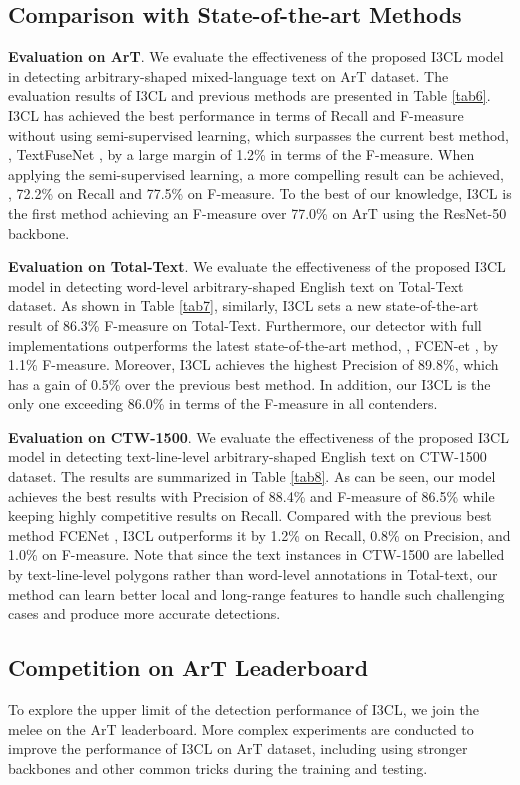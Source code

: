 \subsection{Comparison with State-of-the-art Methods}

\noindent\textbf{Evaluation on ArT}. We evaluate the effectiveness of the proposed I3CL model in detecting arbitrary-shaped mixed-language text on ArT dataset. The evaluation results of I3CL and previous methods are presented in Table \ref{tab6}. I3CL has achieved the best performance in terms of Recall and F-measure without using semi-supervised learning, which surpasses the current best method, , TextFuseNet \citep{textfusenet}, by a large margin of 1.2\% in terms of the F-measure. When applying the semi-supervised learning, a more compelling result can be achieved, , 72.2\% on Recall and 77.5\% on F-measure. To the best of our knowledge, I3CL is the first method achieving an F-measure over 77.0\% on ArT using the ResNet-50 backbone.

\noindent\textbf{Evaluation on Total-Text}. We evaluate the effectiveness of the proposed I3CL model in detecting word-level arbitrary-shaped English text on Total-Text dataset. As shown in Table \ref{tab7}, similarly, I3CL sets a new state-of-the-art result of 86.3\% F-measure on Total-Text. Furthermore, our detector with full implementations outperforms the latest state-of-the-art method, , FCEN-et \citep{fcenet}, by 1.1\% F-measure. Moreover, I3CL achieves the highest Precision of 89.8\%, which has a gain of 0.5\% over the previous best method. In addition, our I3CL is the only one exceeding 86.0\% in terms of the F-measure in all contenders.

\noindent\textbf{Evaluation on CTW-1500}. We evaluate the effectiveness of the proposed I3CL model in detecting text-line-level arbitrary-shaped English text on CTW-1500 dataset. The results are summarized in Table \ref{tab8}. As can be seen, our model achieves the best results with Precision of 88.4\% and F-measure of 86.5\% while keeping highly competitive results on Recall. Compared with the previous best method FCENet \citep{fcenet}, I3CL outperforms it by 1.2\% on Recall, 0.8\% on Precision, and 1.0\% on F-measure. Note that since the text instances in CTW-1500 are labelled by text-line-level polygons rather than word-level annotations in Total-text, our method can learn better local and long-range features to handle such challenging cases and produce more accurate detections.

\subsection{Competition on ArT Leaderboard}
To explore the upper limit of the detection performance of I3CL, we join the melee on the ArT leaderboard. More complex experiments are conducted to improve the performance of I3CL on ArT dataset, including using stronger backbones and other common tricks during the training and testing.

